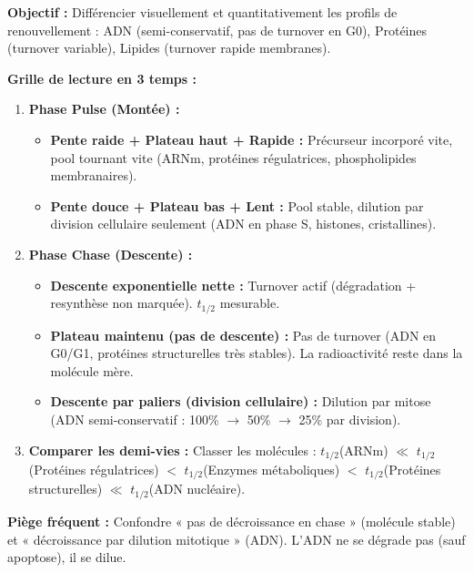 \documentclass[11pt]{article}
\begin{document}
\begin{methode}
\textbf{Objectif :} Différencier visuellement et quantitativement les profils de renouvellement : ADN (semi-conservatif, pas de turnover en G0), Protéines (turnover variable), Lipides (turnover rapide membranes).
\par
\textbf{Grille de lecture en 3 temps :}
\begin{enumerate}
    \item \textbf{Phase Pulse (Montée) :} 
    \begin{itemize}
        \item \textbf{Pente raide + Plateau haut + Rapide :} Précurseur incorporé vite, pool tournant vite (ARNm, protéines régulatrices, phospholipides membranaires).
        \item \textbf{Pente douce + Plateau bas + Lent :} Pool stable, dilution par division cellulaire seulement (ADN en phase S, histones, cristallines).
    \end{itemize}
    \item \textbf{Phase Chase (Descente) :} 
    \begin{itemize}
        \item \textbf{Descente exponentielle nette :} Turnover actif (dégradation + resynthèse non marquée). $t_{1/2}$ mesurable.
        \item \textbf{Plateau maintenu (pas de descente) :} Pas de turnover (ADN en G0/G1, protéines structurelles très stables). La radioactivité reste dans la molécule mère.
        \item \textbf{Descente par paliers (division cellulaire) :} Dilution par mitose (ADN semi-conservatif : 100\% $\to$ 50\% $\to$ 25\% par division).
    \end{itemize}
    \item \textbf{Comparer les demi-vies :} Classer les molécules : $t_{1/2}$(ARNm) $\ll$ $t_{1/2}$(Protéines régulatrices) $<$ $t_{1/2}$(Enzymes métaboliques) $<$ $t_{1/2}$(Protéines structurelles) $\ll$ $t_{1/2}$(ADN nucléaire).
\end{enumerate}
\textbf{Piège fréquent :} Confondre « pas de décroissance en chase » (molécule stable) et « décroissance par dilution mitotique » (ADN). L'ADN ne se dégrade pas (sauf apoptose), il se dilue.
\end{methode}
\end{document}
